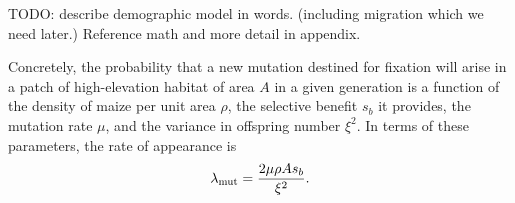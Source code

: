 TODO: describe demographic model in words.  (including migration which we need later.)
Reference math and more detail in appendix.


Concretely, the probability that a new mutation destined for fixation
will arise in a patch of high-elevation habitat of area $A$ in a given generation
is a function of the density of maize per unit area $\rho$,
the selective benefit $s_b$ it provides,
the mutation rate $\mu$,
and the variance in offspring number $\xi^2$.
In terms of these parameters, the rate of appearance is
\begin{align} \label{eqn:mutrate}
  \lambda_{\text{mut}} = \frac{2 \mu \rho A s_b}{\xi^2} .
\end{align}

